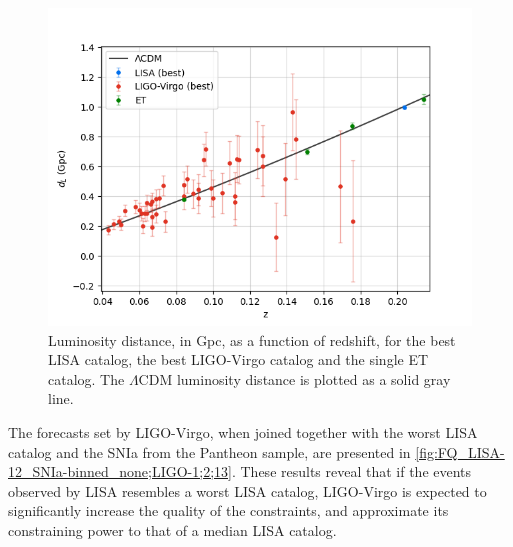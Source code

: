\begin{figure}[h!]
    \centering
    \includegraphics[width=0.65\columnwidth]{figures/LISA-9,LIGO-13,ET-4,low-redshifts.png}
    \caption[Luminosity distance, in Gpc, as a function of redshift for the best LISA catalog, the best LIGO-Virgo catalog and the ET catalog]
    {Luminosity distance, in Gpc, as a function of redshift, for the best \gls{LISA} catalog, the best \gls{LIGO}-Virgo catalog and the single \gls{ET} catalog. The $\Lambda$CDM luminosity distance is plotted as a solid gray line.}
    \label{fig:LISA-9;LIGO-13;ET-4;low-redshifts}
\end{figure}

The forecasts set by \gls{LIGO}-Virgo, when joined together with the worst \gls{LISA} catalog and the \gls{SNIa} from the Pantheon sample, are presented in \cref{fig:FQ_LISA-12_SNIa-binned_none;LIGO-1;2;13}. These results reveal that if the events observed by \gls{LISA} resembles a worst \gls{LISA} catalog, \gls{LIGO}-Virgo is expected to significantly increase the quality of the constraints, and approximate its constraining power to that of a median \gls{LISA} catalog.

